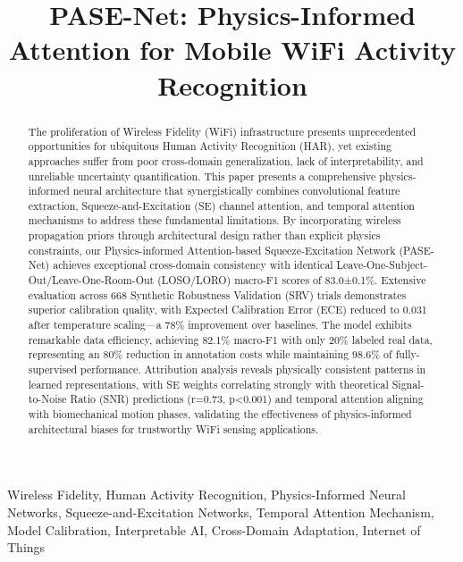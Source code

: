 \documentclass[lettersize,journal]{IEEEtran}
\begin{document}
\title{PASE-Net: Physics-Informed Attention for Mobile WiFi Activity Recognition}

\author{
}

\maketitle

\begin{abstract}
The proliferation of Wireless Fidelity (WiFi) infrastructure presents unprecedented opportunities for ubiquitous Human Activity Recognition (HAR), yet existing approaches suffer from poor cross-domain generalization, lack of interpretability, and unreliable uncertainty quantification. This paper presents a comprehensive physics-informed neural architecture that synergistically combines convolutional feature extraction, Squeeze-and-Excitation (SE) channel attention, and temporal attention mechanisms to address these fundamental limitations. By incorporating wireless propagation priors through architectural design rather than explicit physics constraints, our Physics-informed Attention-based Squeeze-Excitation Network (PASE-Net) achieves exceptional cross-domain consistency with identical Leave-One-Subject-Out/Leave-One-Room-Out (LOSO/LORO) macro-F1 scores of 83.0±0.1\%. Extensive evaluation across 668 Synthetic Robustness Validation (SRV) trials demonstrates superior calibration quality, with Expected Calibration Error (ECE) reduced to 0.031 after temperature scaling—a 78\% improvement over baselines. The model exhibits remarkable data efficiency, achieving 82.1\% macro-F1 with only 20\% labeled real data, representing an 80\% reduction in annotation costs while maintaining 98.6\% of fully-supervised performance. Attribution analysis reveals physically consistent patterns in learned representations, with SE weights correlating strongly with theoretical Signal-to-Noise Ratio (SNR) predictions (r=0.73, p<0.001) and temporal attention aligning with biomechanical motion phases, validating the effectiveness of physics-informed architectural biases for trustworthy WiFi sensing applications.
\end{abstract}

\begin{IEEEkeywords}
Wireless Fidelity, Human Activity Recognition, Physics-Informed Neural Networks, Squeeze-and-Excitation Networks, Temporal Attention Mechanism, Model Calibration, Interpretable AI, Cross-Domain Adaptation, Internet of Things
\end{IEEEkeywords}
\end{document}
